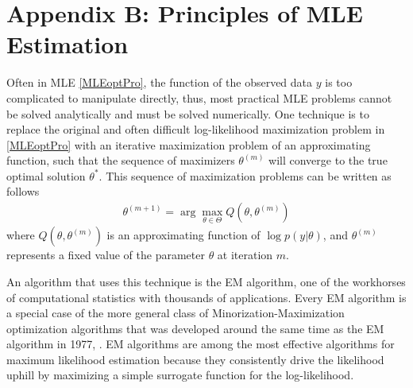 \documentclass[12pt, draftclsnofoot, onecolumn]{IEEEtran}
\theoremstyle{plain}
\begin{document}
\section*{Appendix B: Principles of MLE Estimation}\label{MLEprin}
Often in MLE \eqref{MLEoptPro}, the function of the observed data $y$ is too complicated to manipulate directly, thus, most practical MLE problems cannot be solved analytically and must be solved numerically. One technique is to replace the original and often difficult log-likelihood maximization problem in \eqref{MLEoptPro} 
with an iterative maximization problem of an approximating function, such that the sequence of maximizers ${\theta^{(m)}}$ will converge to the true optimal solution $\theta^{*}$. %
This sequence of maximization problems can be written as follows
\begin{eqnarray}
\theta^{(m+1)}=\arg \max_{\theta \in \Theta} {Q(\theta,\theta^{(m)})}
\end{eqnarray}
where 
$Q(\theta,\theta^{(m)})$ is an approximating function of $\log p(y|\theta)$, and $\theta^{(m)}$ represents a fixed value of the parameter $\theta$ at iteration $m$. 

An algorithm that uses this technique is the  EM algorithm, one of the workhorses of computational statistics with
thousands of applications. Every EM algorithm is a special case of the more general class of Minorization-Maximization optimization algorithms that was developed around the same time as the EM algorithm in 1977, \cite{dempster1977maximum,de1977convergence}.
EM algorithms are among the most
effective algorithms for maximum likelihood estimation because they consistently drive the likelihood uphill by maximizing a simple surrogate function for the log-likelihood.
\end{document}
